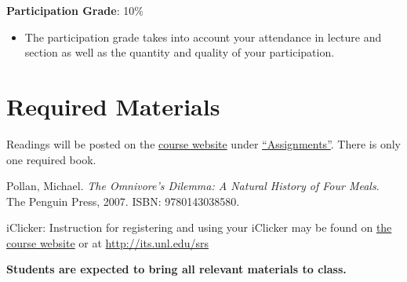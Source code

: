 \documentclass[12pt]{article}
\begin{document}
  \noindent\textbf{Participation Grade}: 10\%
  \begin{itemize}
  \item The participation grade takes into account your attendance in lecture and section as well as the quantity and quality of your participation.
  \end{itemize}
  \section*{Required Materials} Readings will be posted on the
    \href{http://colinmclear.net/phil105}{course website} under
    \href{http://colinmclear.net/phil105-assignments}{``Assignments''}. There is only one required book.
  \begin{itemize*}
    \item Pollan, Michael. \emph{The Omnivore's Dilemma: A Natural History of Four Meals}. The Penguin Press, 2007. ISBN: 9780143038580.
    \item iClicker: Instruction for registering and using your iClicker
      may be found on \href{http://colinmclear.net/phil105}{the course website} or at \href{http://its.unl.edu/srs}{http://its.unl.edu/srs}
  \end{itemize*}
  \textbf{Students are expected to bring all relevant materials to class.}
\end{document}
